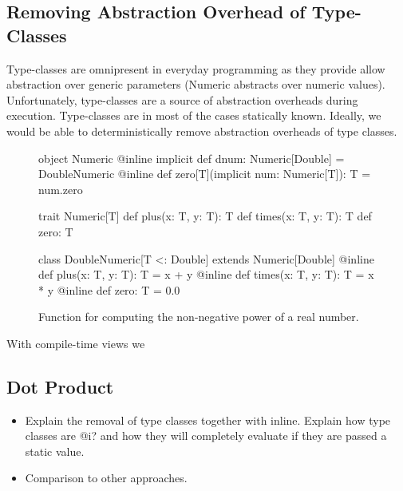 \subsection{Removing Abstraction Overhead of Type-Classes}
\label{sct:type-classes-removal}
Type-classes are omnipresent in everyday programming as they provide allow abstraction over
 generic parameters (\eg Numeric abstracts over numeric values). Unfortunately,
 type-classes are a source of abstraction overheads during execution. Type-classes
 are in most of the cases statically known. Ideally, we would be able to
 deterministically remove abstraction overheads of type classes.

\begin{figure}
\begin{listing}
object Numeric {
  @inline implicit def dnum: Numeric[Double] = DoubleNumeric
  @inline def zero[T](implicit num: Numeric[T]): T = num.zero
}

trait Numeric[T] {
  def plus(x: T, y: T): T
  def times(x: T, y: T): T
  def zero: T
}

class DoubleNumeric[T <: Double] extends Numeric[Double] {
  @inline def plus(x: T, y: T): T = x + y
  @inline def times(x: T, y: T): T = x * y
  @inline def zero: T = 0.0
}

\end{listing}
\caption{\label{fig:numeric} Function for computing the non-negative power of a real number.}
\end{figure}


With compile-time views we

\subsection{Dot Product}
\label{sct:dot-product}
\begin{itemize}
  \item Explain the removal of type classes together with inline. Explain how type classes
  are @i? and how they will completely evaluate if they are passed a static value.
  \item Comparison to other approaches.
\end{itemize}


